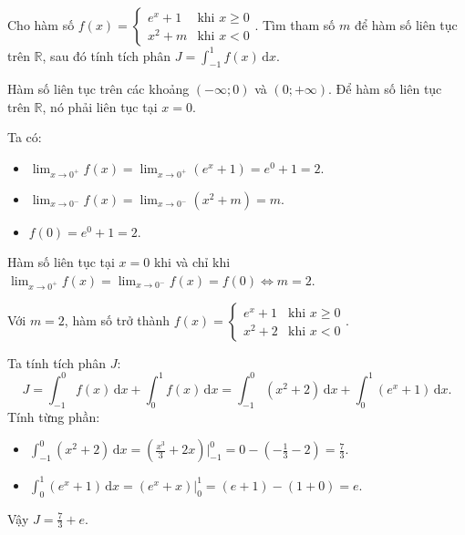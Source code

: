 \documentclass[12pt]{article}
\begin{document}
	\begin{vidu}
		Cho hàm số $f(x) = \begin{cases} e^x + 1 & \text{khi } x \ge 0 \\ x^2 + m & \text{khi } x < 0 \end{cases}$. Tìm tham số $m$ để hàm số liên tục trên $\mathbb{R}$, sau đó tính tích phân $J = \displaystyle \int_{-1}^{1} f(x)\,\mathrm{d}x$.
	\end{vidu}
	\begin{loigiai}
		Hàm số liên tục trên các khoảng $(-\infty; 0)$ và $(0; +\infty)$. Để hàm số liên tục trên $\mathbb{R}$, nó phải liên tục tại $x = 0$.
		
		Ta có:
		\begin{itemize}
			\item $\displaystyle \lim_{x \to 0^+} f(x) = \lim_{x \to 0^+} (e^x + 1) = e^0 + 1 = 2$.
			\item $\displaystyle \lim_{x \to 0^-} f(x) = \lim_{x \to 0^-} (x^2 + m) = m$.
			\item $f(0) = e^0 + 1 = 2$.
		\end{itemize}
		Hàm số liên tục tại $x = 0$ khi và chỉ khi $\displaystyle \lim_{x \to 0^+} f(x) = \lim_{x \to 0^-} f(x) = f(0) \iff m = 2$.
		
		Với $m = 2$, hàm số trở thành $f(x) = \begin{cases} e^x + 1 & \text{khi } x \ge 0 \\ x^2 + 2 & \text{khi } x < 0 \end{cases}$.
		
		Ta tính tích phân $J$:
		\[
		J = \int_{-1}^{0} f(x)\,\mathrm{d}x + \int_{0}^{1} f(x)\,\mathrm{d}x = \int_{-1}^{0} (x^2 + 2)\,\mathrm{d}x + \int_{0}^{1} (e^x + 1)\,\mathrm{d}x.
		\]
		Tính từng phần:
		\begin{itemize}
			\item $\displaystyle \int_{-1}^{0} (x^2 + 2)\,\mathrm{d}x = \left( \frac{x^3}{3} + 2x \right) \Bigg|_{-1}^0 = 0 - \left( -\frac{1}{3} - 2 \right) = \frac{7}{3}$.
			\item $\displaystyle \int_{0}^{1} (e^x + 1)\,\mathrm{d}x = (e^x + x) \Big|_0^1 = (e + 1) - (1 + 0) = e$.
		\end{itemize}
		Vậy $J = \frac{7}{3} + e$.
	\end{loigiai}
\end{document}
